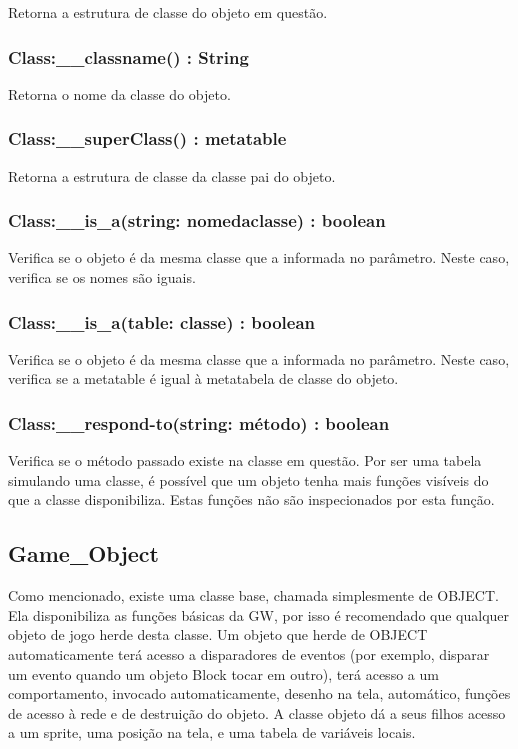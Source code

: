 \documentclass[
	12pt,				%
	openright,			%
	oneside,			%
	a4paper,			%
	brazil,				%
	]{abntex2}
\begin{document}
Retorna a estrutura de classe do objeto em questão.

\subsubsection{Class:\_\_classname() : String}

Retorna o nome da classe do objeto.

\subsubsection{Class:\_\_superClass() : metatable}

Retorna a estrutura de classe da classe pai do objeto.

\subsubsection{Class:\_\_is\_a(string: nomedaclasse) : boolean}

Verifica se o objeto é da mesma classe que a informada no parâmetro. Neste caso, verifica se os nomes são iguais.

\subsubsection{Class:\_\_is\_a(table: classe) : boolean}

Verifica se o objeto é da mesma classe que a informada no parâmetro. Neste caso, verifica se a metatable é igual à metatabela de classe do objeto.

\subsubsection{Class:\_\_respond-to(string: método) : boolean}

Verifica se o método passado existe na classe em questão. Por ser uma tabela simulando uma classe, é possível que um objeto tenha mais funções visíveis do que a classe disponibiliza. Estas funções não são inspecionados por esta função.

\subsection{Game\_Object}

Como mencionado, existe uma classe base, chamada simplesmente de OBJECT. Ela disponibiliza as funções básicas da GW, por isso é recomendado que qualquer objeto de jogo herde desta classe. Um objeto que herde de OBJECT automaticamente terá acesso a disparadores de eventos (por exemplo, disparar um evento quando um objeto Block tocar em outro), terá acesso a um comportamento, invocado automaticamente, desenho na tela, automático, funções de acesso à rede e de destruição do objeto. A classe objeto dá a seus filhos acesso a um sprite, uma posição na tela, e uma tabela de variáveis locais.
\end{document}
